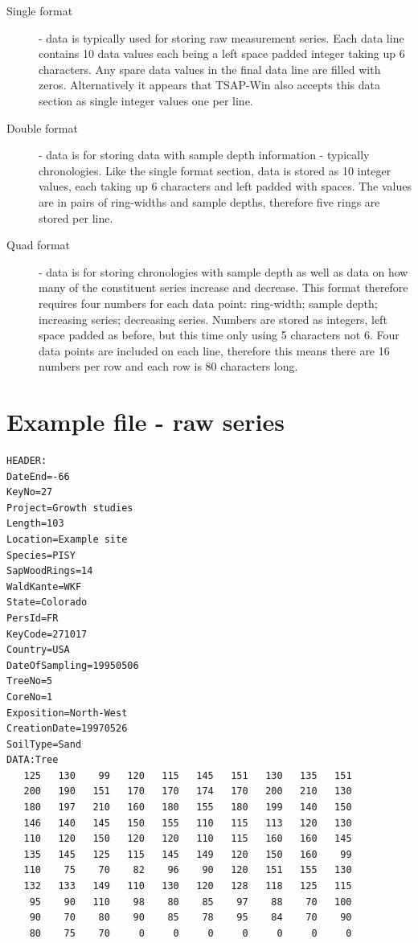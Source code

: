 \begin{description}
\item[Single format] - data is typically used for storing raw measurement series. Each data line contains 10 data values each being a left space padded integer taking up 6 characters. Any spare data values in the final data line are filled with zeros. Alternatively it appears that TSAP-Win also accepts this data section as single integer values one per line.

\item[Double format] - data is for storing data with sample depth information - typically chronologies. Like the single format section, data is stored as 10 integer values, each taking up 6 characters and left padded with spaces. The values are in pairs of ring-widths and sample depths, therefore five rings are stored per line.

\item[Quad format] - data is for storing chronologies with sample depth as well as data on how many of the constituent series increase and decrease. This format therefore requires four numbers for each data point: ring-width; sample depth; increasing series; decreasing series. Numbers are stored as integers, left space padded as before, but this time only using 5 characters not 6. Four data points are included on each line, therefore this means there are 16 numbers per row and each row is 80 characters long. 
\end{description}

\newpage
\section{Example file - raw series}

\begin{lstlisting}
HEADER:
DateEnd=-66
KeyNo=27
Project=Growth studies
Length=103
Location=Example site
Species=PISY
SapWoodRings=14
WaldKante=WKF
State=Colorado
PersId=FR
KeyCode=271017
Country=USA
DateOfSampling=19950506
TreeNo=5
CoreNo=1
Exposition=North-West
CreationDate=19970526
SoilType=Sand
DATA:Tree
   125   130    99   120   115   145   151   130   135   151
   200   190   151   170   170   174   170   200   210   130
   180   197   210   160   180   155   180   199   140   150
   146   140   145   150   155   110   115   113   120   130
   110   120   150   120   120   110   115   160   160   145
   135   145   125   115   145   149   120   150   160    99
   110    75    70    82    96    90   120   151   155   130
   132   133   149   110   130   120   128   118   125   115
    95    90   110    98    80    85    97    88    70   100
    90    70    80    90    85    78    95    84    70    90
    80    75    70     0     0     0     0     0     0     0
\end{lstlisting}

